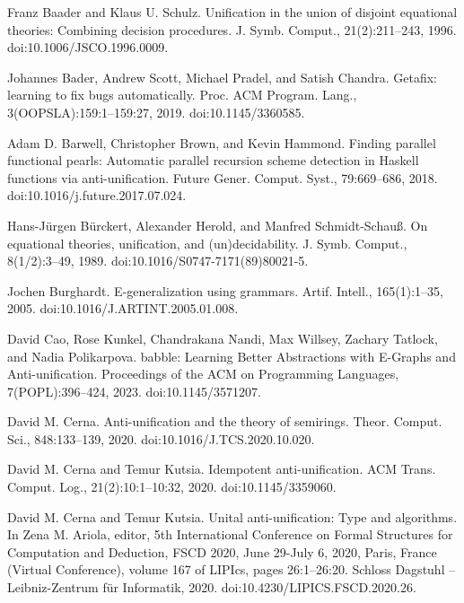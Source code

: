 \par\noindent  [7]  Franz Baader and Klaus U. Schulz.  Unification in the union of disjoint equational theories: Combining decision procedures.  J. Symb. Comput., 21(2):211–243, 1996.  doi:10.1006/JSCO.1996.0009.  
 
\par\noindent  [8]  Johannes Bader, Andrew Scott, Michael Pradel, and Satish Chandra.  Getafix: learning to fix bugs automatically.  Proc. ACM Program. Lang., 3(OOPSLA):159:1–159:27, 2019.  doi:10.1145/3360585.  
 
\par\noindent  [9]  Adam D. Barwell, Christopher Brown, and Kevin Hammond.  Finding parallel functional pearls: Automatic parallel recursion scheme detection in Haskell functions via anti-unification.  Future Gener. Comput. Syst., 79:669–686, 2018.  doi:10.1016/j.future.2017.07.024.  
 
\par\noindent  [10]  Hans-Jürgen Bürckert, Alexander Herold, and Manfred Schmidt-Schauß.  On equational theories, unification, and (un)decidability.  J. Symb. Comput., 8(1/2):3–49, 1989.  doi:10.1016/S0747-7171(89)80021-5.  
 
\par\noindent  [11]  Jochen Burghardt.  E-generalization using grammars.  Artif. Intell., 165(1):1–35, 2005.  doi:10.1016/J.ARTINT.2005.01.008.  
 
\par\noindent  [12]  David Cao, Rose Kunkel, Chandrakana Nandi, Max Willsey, Zachary Tatlock, and Nadia Polikarpova.  babble: Learning Better Abstractions with E-Graphs and Anti-unification.  Proceedings of the ACM on Programming Languages, 7(POPL):396–424, 2023.  doi:10.1145/3571207.  
 
\par\noindent  [13]  David M. Cerna.  Anti-unification and the theory of semirings.  Theor. Comput. Sci., 848:133–139, 2020.  doi:10.1016/J.TCS.2020.10.020.  
 
\par\noindent  [14]  David M. Cerna and Temur Kutsia.  Idempotent anti-unification.  ACM Trans. Comput. Log., 21(2):10:1–10:32, 2020.  doi:10.1145/3359060.  
 
\par\noindent  [15]  David M. Cerna and Temur Kutsia.  Unital anti-unification: Type and algorithms.  In Zena M. Ariola, editor, 5th International Conference on Formal Structures for Computation and Deduction, FSCD 2020, June 29-July 6, 2020, Paris, France (Virtual Conference), volume 167 of LIPIcs, pages 26:1–26:20. Schloss Dagstuhl – Leibniz-Zentrum für Informatik, 2020.  doi:10.4230/LIPICS.FSCD.2020.26.  
 
